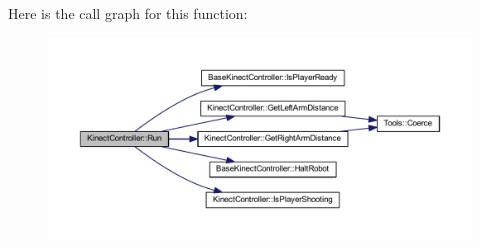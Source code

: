 \-Here is the call graph for this function\-:\nopagebreak
\begin{figure}[H]
\begin{center}
\leavevmode
\includegraphics[width=350pt]{class_kinect_controller_a7252c3d29afaf83fa742925b2f23da0c_cgraph}
\end{center}
\end{figure}




